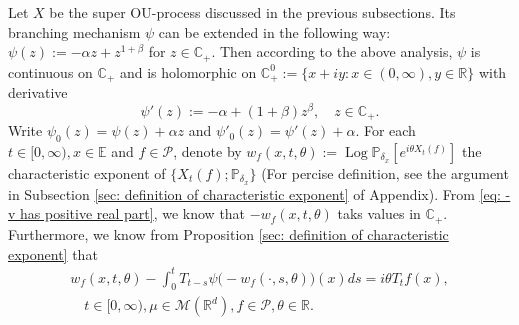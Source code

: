 \documentclass[12pt, a4paper]{amsart}
\theoremstyle{definition}
\numberwithin{equation}{section}
\begin{document}
    Let $X$ be the super OU-process discussed in the previous subsections.
    Its branching mechanism $\psi$ can be extended in the following way: $\psi(z) := -\alpha z + z^{1+\beta}$ for $z\in \mathbb C_+$. 
    Then according to the above analysis, $\psi$ is continuous on $\mathbb C_+$ and is holomorphic on $\mathbb C_+^0:=\{x+iy:x \in (0,\infty), y\in \mathbb R\}$ with derivative
\begin{equation}
\label{eq: deriavetive of the Poission part}
    \psi'(z) := -\alpha + (1+\beta)z^{\beta},
    \quad z\in \mathbb C_+.
\end{equation}
Write $\psi_0(z) = \psi(z) + \alpha z$ and $\psi'_0(z) = \psi'(z) + \alpha$.
    For each $t\in [0,\infty), x\in \mathbb E$ and $f \in \mathcal{P}$, denote by $w_f(x,t,\theta):= \operatorname{Log} \mathbb P_{\delta_x}[e^{i\theta X_t(f)}]$ the characteristic exponent of $\{X_t(f); \mathbb P_{\delta_x}\}$
    (For percise definition, see the argument in Subsection \ref{sec: definition of characteristic exponent} of Appendix).
    From \eqref{eq: -v has positive real part}, we know that $- w_f(x,t,\theta)$ taks values in $\mathbb C_+$.
    Furthermore, we know from Proposition \ref{sec: definition of characteristic exponent} that
\begin{align}\label{charequation}
    w_f(x,t,\theta)-\int_0^t T_{t-s} \psi \big(-w_f(\cdot,s,\theta)\big)(x)ds
    =i\theta T_tf(x),
    \\ \quad t\in [0,\infty), \mu\in \mathcal M(\mathbb R^d), f\in \mathcal P, \theta \in \mathbb R.
\end{align}
\end{document}
